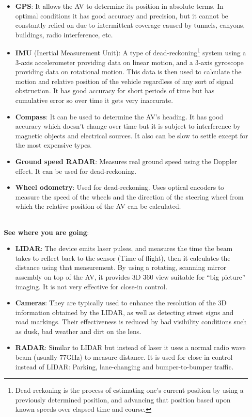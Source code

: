 \documentclass[11pt]{article}
\begin{document}
\begin{itemize}
\item \textbf{GPS}: It allows the AV to determine its position in absolute terms. In optimal conditions it has good accuracy and precision, but it cannot be constantly relied on due to intermittent coverage caused by tunnels, canyons, buildings, radio interference, etc. \cite{SchweberMouser}
\item \textbf{IMU} (Inertial Measurement Unit): A type of dead-reckoning\footnote{Dead-reckoning is the process of estimating one's current position by using a previously determined position, and advancing that position based upon known speeds over elapsed time and course.} system using a 3-axis accelerometer providing data on linear motion, and a 3-axis gyroscope providing data on rotational motion. This data is then used to calculate the motion and relative position of the vehicle regardless of any sort of signal obstruction. It has good accuracy for short periods of time but has cumulative error so over time it gets very inaccurate. \cite{SchweberMouser}\cite{HellstromUmea}
\item \textbf{Compass}: It can be used to determine the AV's heading. It has good accuracy which doesn't change over time but it is subject to interference by magnetic objects and electrical sources. It also can be slow to settle except for the most expensive types. \cite{HellstromUmea}\cite{BeesonTexas09}
\item \textbf{Ground speed RADAR}: Measures real ground speed using the Doppler effect. It can be used for dead-reckoning. \cite{HellstromUmea}
\item \textbf{Wheel odometry}: Used for dead-reckoning. Uses optical encoders to measure the speed of the wheels and the direction of the steering wheel from which the relative position of the AV can be calculated. \cite{HellstromUmea}\cite{BeesonTexas09}
\end{itemize}
$~$\\
\textbf{See where you are going}:
\begin{itemize}
\item \textbf{LIDAR}: The device emits laser pulses, and measures the time the beam takes to reflect back to the sensor (Time-of-flight), then it calculates the distance using that measurement. By using a rotating, scanning mirror assembly on top of the AV, it provides 3D 360{\textdegree} view suitable for ``big picture'' imaging. It is not very effective for close-in control. \cite{SchweberMouser}\cite{BeesonTexas09}
\item \textbf{Cameras}: They are typically used to enhance the resolution of the 3D information obtained by the LIDAR, as well as detecting street signs and road markings. Their effectiveness is reduced by bad visibility conditions such as dusk, bad weather and dirt on the lens. \cite{SchweberMouser}\cite{HellstromUmea}
\item \textbf{RADAR}: Similar to LIDAR but instead of laser it uses a normal radio wave beam (usually 77GHz) to measure distance. It is used for close-in control instead of LIDAR: Parking, lane-changing and bumper-to-bumper traffic. \cite{SchweberMouser}\cite{BeesonTexas09}\cite{HellstromUmea}
\end{itemize}
\end{document}
